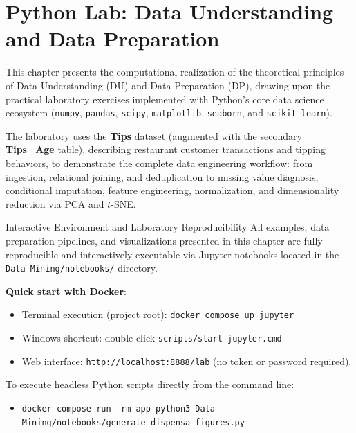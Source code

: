 \chapter{Python Lab: Data Understanding and Data Preparation}
\label{chap:dm-python-lab-du-dp}

This chapter presents the computational realization of the theoretical principles of Data Understanding (DU) and Data Preparation (DP), drawing upon the practical laboratory exercises implemented with Python's core data science ecosystem (\texttt{numpy}, \texttt{pandas}, \texttt{scipy}, \texttt{matplotlib}, \texttt{seaborn}, and \texttt{scikit-learn}).

The laboratory uses the \textbf{Tips} dataset (augmented with the secondary \textbf{Tips\_Age} table), describing restaurant customer transactions and tipping behaviors, to demonstrate the complete data engineering workflow: from ingestion, relational joining, and deduplication to missing value diagnosis, conditional imputation, feature engineering, normalization, and dimensionality reduction via PCA and $t$-SNE.

\begin{noteblock}{Interactive Environment and Laboratory Reproducibility}
    All examples, data preparation pipelines, and visualizations presented in this chapter are fully reproducible and interactively executable via Jupyter notebooks located in the \texttt{Data-Mining/notebooks/} directory.
    
    \textbf{Quick start with Docker}:
    \begin{itemize}[noitemsep]
        \item Terminal execution (project root): \texttt{docker compose up jupyter}
        \item Windows shortcut: double-click \texttt{scripts/start-jupyter.cmd}
        \item Web interface: \href{http://localhost:8888/lab}{\texttt{http://localhost:8888/lab}} (no token or password required).
    \end{itemize}
    To execute headless Python scripts directly from the command line:
    \begin{itemize}[noitemsep]
        \item \texttt{docker compose run --rm app python3 Data-Mining/notebooks/generate\_dispensa\_figures.py}
    \end{itemize}
\end{noteblock}

